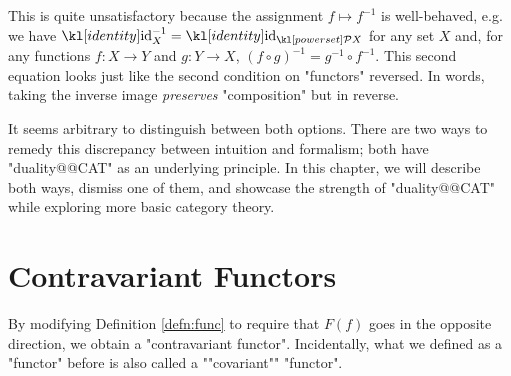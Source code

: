 \documentclass[main.tex]{subfiles}
\begin{document}
This is quite unsatisfactory because the assignment $f \mapsto f^{-1}$ is well-behaved, e.g. we have $\id_X^{-1} = \id_{\mP X}$ for any set $X$ and, for any functions $f: X \rightarrow Y$ and $g: Y \rightarrow X$, $(f \circ g)^{-1} = g^{-1} \circ f^{-1}$. This second equation looks just like the second condition on "functors" reversed. In words, taking the inverse image \textit{preserves} "composition" but in reverse.

It seems arbitrary to distinguish between both options. There are two ways to remedy this discrepancy between intuition and formalism; both have "duality@@CAT" as an underlying principle. In this chapter, we will describe both ways, dismiss one of them, and showcase the strength of "duality@@CAT" while exploring more basic category theory.
\section{Contravariant Functors}
By modifying Definition \ref{defn:func} to require that $F(f)$ goes in the opposite direction, we obtain a "contravariant functor". \AP Incidentally, what we defined as a "functor" before is also called a ""covariant"" "functor".
\end{document}
